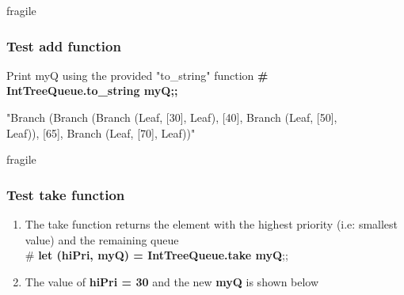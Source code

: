 \documentclass{beamer}
\begin{document}
\begin{frame}{fragile}
\frametitle{Test add function}

\begin{center}
\end{center}

\begin{block}{Print myQ using the provided "to\_string" function}
{\bf \# IntTreeQueue.to\_string myQ;;}

\vspace*{0.1in}
"Branch (Branch (Branch (Leaf, [30], Leaf), [40], Branch (Leaf, [50], \\ \hspace*{1.95in}Leaf)), [65], Branch (Leaf, [70], Leaf))"
\end{block}

\end{frame}



\begin{frame}{fragile}
\frametitle{Test take function}

\begin{example}
\begin{enumerate}
\item The take function returns the element with the highest priority (i.e: smallest value) and the remaining queue\\
 \# {\bf let (hiPri, myQ) = IntTreeQueue.take myQ};;
\item The value of {\bf hiPri = 30} and the new {\bf myQ} is shown below
\end{enumerate}
\end{example}

\begin{center}
\end{center}

\end{frame}
\end{document}
